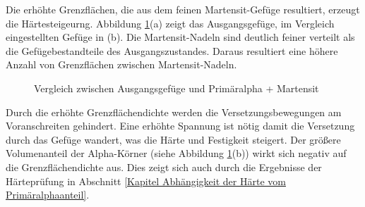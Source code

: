 \documentclass[a4paper, 11pt]{tubsreprt}
\begin{document}
Die erhöhte Grenzflächen, die aus dem feinen Martensit-Gefüge resultiert, erzeugt die Härtesteigeurng. Abbildung \ref{Vergleich Primäralpha martensit}(a) zeigt das Ausgangsgefüge, im Vergleich eingestellten Gefüge in (b). Die Martensit-Nadeln sind deutlich feiner verteilt als die Gefügebestandteile des Ausgangszustandes. Daraus resultiert eine höhere Anzahl von Grenzflächen zwischen Martensit-Nadeln.

\begin{figure}
\caption{Vergleich zwischen Ausgangsgefüge und Primäralpha + Martensit}
\label{Vergleich Primäralpha martensit}
\end{figure}


Durch die erhöhte Grenzflächendichte werden die Versetzungsbewegungen am Voranschreiten gehindert. Eine erhöhte Spannung ist nötig damit die Versetzung durch das Gefüge wandert, was die Härte und Festigkeit steigert. Der größere Volumenanteil der Alpha-Körner (siehe Abbildung \ref{Vergleich Primäralpha martensit}(b)) wirkt sich negativ auf die Grenzflächendichte aus. Dies zeigt sich auch durch die Ergebnisse der Härteprüfung in Abschnitt \ref{Kapitel Abhängigkeit der Härte vom Primäralphaanteil}. 
\end{document}
